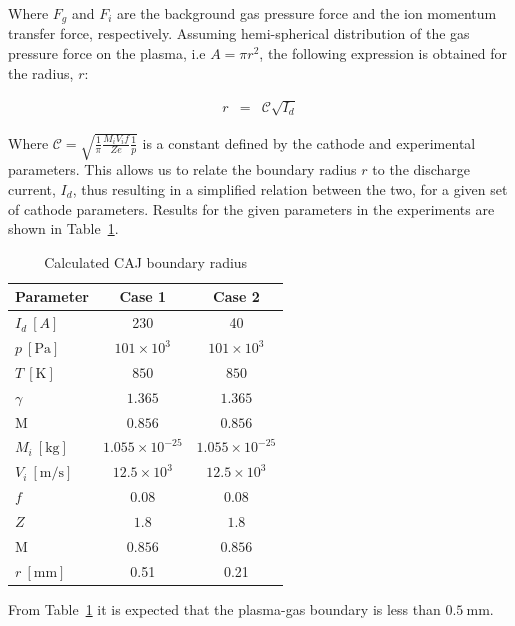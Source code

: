 \documentclass[a4paper]{iacas}%
\begin{document}
Where $F_g$ and $F_i$ are the background gas pressure force and the ion momentum transfer force, respectively. Assuming hemi-spherical distribution of the gas pressure force on the plasma, i.e $A = \pi r^2$, the following expression is obtained for the radius, $r$:

\begin{eqnarray}
\label{eqn:rad_equiv_force}
	r & = & \mathcal{C}\sqrt{I_d}
\end{eqnarray}


Where $\mathcal{C} = \sqrt{\frac{1}{\pi}\frac{M_i V_i f}{Z e}\frac{1}{p}}$ is a constant defined by the cathode and experimental parameters. This allows us to relate the boundary radius $r$ to the discharge current, $I_d$, thus resulting in a simplified relation between the two, for a given set of cathode parameters. Results for the given parameters in the experiments \cite{KR,KRClose} are shown in Table~\ref{t:radii}.
\begin{table}[h]
	\begin{center}
		\begin{threeparttable}
			\caption{Calculated CAJ boundary radius}
			\label{t:radii}
			\begin{tabular}{l|c|c}
				Parameter & Case 1 & Case 2\\ \hline
				$I_d~[A]$& 230 & 40\\
				$p~\mathrm{[Pa]}$ & $101 \times 10^3 $ & $101 \times 10^3 $ \\
				$T~\mathrm{[K]}$	& $850$ & $850$ \\
				$\gamma$ & $1.365$ & $1.365$ \\ 
				$\mathrm{M}$	& $0.856$ & $0.856$ \\
				$M_i~\mathrm{[kg]}$ & $1.055 \times 10^{-25} $ & $1.055 \times 10^{-25} $  \\
				$V_i~\mathrm{[m/s]}$ 	& $12.5 \times 10^3 $ & $12.5 \times 10^3 $  \\
				$f$ 	& $0.08 $ & $0.08 $ \\
				$Z$	& $1.8 $ & $1.8 $ \\
				$\mathrm{M}$	& $0.856$ & $0.856$ \\
				$r~\mathrm{[mm]}$ 	& 0.51& 0.21
			\end{tabular}
		\end{threeparttable}
	\end{center}
\end{table}
From Table~\ref{t:radii} it is expected that the plasma-gas boundary is less than $0.5~\mathrm{mm}$.
\end{document}
